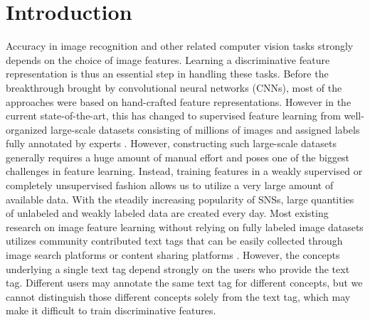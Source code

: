 \documentclass[letterpaper]{article} %
\begin{document}
\section{Introduction}
\label{sec:intro}

Accuracy in image recognition and other related computer vision tasks strongly depends on the choice of image features.
%
Learning a discriminative feature representation is thus an essential step in handling these tasks.
%
Before the breakthrough brought by convolutional neural networks (CNNs), most of the approaches were based on hand-crafted feature representations.
%
However in the current state-of-the-art, this has changed to supervised feature learning from well-organized large-scale datasets consisting of millions of images and assigned labels fully annotated by experts \cite{He2015}.
%
However, constructing such large-scale datasets generally requires a huge amount of  manual effort and poses one of the biggest challenges in feature learning.
%
Instead, training features in a weakly supervised or completely unsupervised fashion allows us to utilize a very large amount of available data.
%
With the steadily increasing popularity of SNSs, large quantities of unlabeled and weakly labeled data are created every day.
%
Most existing research on image feature learning without relying on fully labeled image datasets utilizes community contributed text tags that can be easily collected through image search platforms \cite{Sukhbaatar2015} or content sharing platforms \cite{Joulin2016}.
%
However, the concepts underlying a single text tag depend strongly on the users who provide the text tag.
%
Different users may annotate the same text tag for different concepts, but we cannot distinguish those different concepts solely from the text tag, which may make it difficult to train discriminative features.
\end{document}
